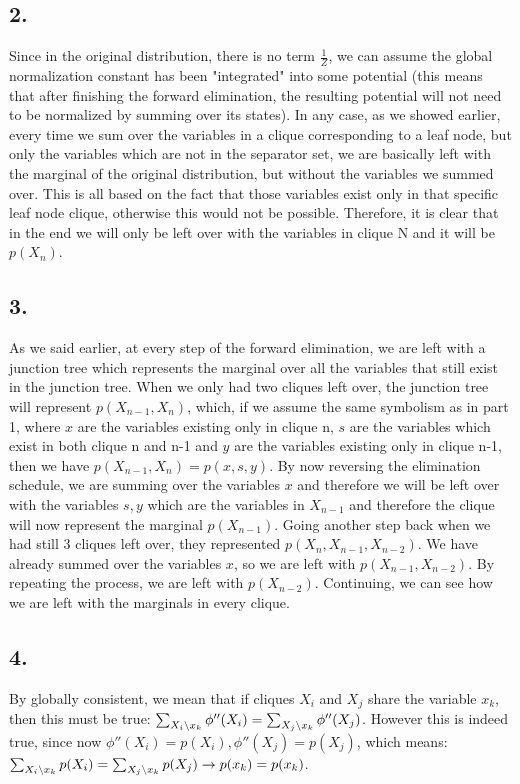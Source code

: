 \documentclass[11pt,a4paper,oneside]{report}
\newcommand\SLASH{\char`\\}
\begin{document}
\subsection*{2.}

Since in the original distribution, there is no term $\frac{1}{Z}$, we can assume the global normalization constant has been "integrated" into some potential (this means that after finishing the forward elimination, the resulting potential will not need to be normalized by summing over its states). In any case, as we showed earlier, every time we sum over the variables in a clique corresponding to a leaf node, but only the variables which are not in the separator set, we are basically left with the marginal of the original distribution, but without the variables we summed over. This is all based on the fact that those variables exist only in that specific leaf node clique, otherwise this would not be possible. Therefore, it is clear that in the end we will only be left over with the variables in clique N and it will be $p(X_n)$.

	
\subsection*{3.}
As we said earlier, at every step of the forward elimination, we are left with a junction tree which represents the marginal over all the variables that still exist in the junction tree. When we only had two cliques left over, the junction tree will represent $p(X_{n-1},X_n)$, which, if we assume the same symbolism as in part 1, where $x$ are the variables existing only in clique n, $s$ are the variables which exist in both clique n and n-1 and $y$ are the variables existing only in clique n-1, then we have $p(X_{n-1},X_n)=p(x,s,y)$. By now reversing the elimination schedule, we are summing over the variables $x$ and therefore we will be left over with the variables $s,y$ which are the variables in $X_{n-1}$ and therefore the clique will now represent the marginal $p(X_{n-1})$. Going another step back when we had still 3 cliques left over, they represented $p(X_n,X_{n-1},X_{n-2})$. We have already summed over the variables $x$, so we are left with $p(X_{n-1},X_{n-2})$. By repeating the process, we are 
left with $p(X_{n-2})$. Continuing, we can see how we are left with the marginals in every clique.

\subsection*{4.}

By globally consistent, we mean that if cliques $X_i$ and $X_j$ share the variable $x_k$, then this must be true: $\sum_{X_i \SLASH x_k} \phi''(X_i) = \sum_{X_j \SLASH x_k} \phi''(X_j)$. However this is indeed true, since now $\phi''(X_i)=p(X_i),\phi''(X_j)=p(X_j)$, which means: $\sum_{X_i \SLASH x_k} p(X_i) = \sum_{X_j \SLASH x_k} p(X_j) \rightarrow p(x_k)=p(x_k)$. 
\end{document}
